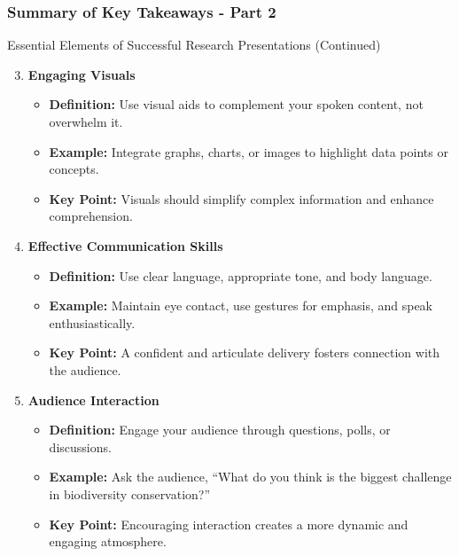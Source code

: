 \documentclass[aspectratio=169]{beamer}
\begin{document}
\begin{frame}[fragile]
    \frametitle{Summary of Key Takeaways - Part 2}
    \begin{block}{Essential Elements of Successful Research Presentations (Continued)}
        \begin{enumerate}
            \setcounter{enumi}{2}
            \item \textbf{Engaging Visuals}
                \begin{itemize}
                    \item \textbf{Definition:} Use visual aids to complement your spoken content, not overwhelm it.
                    \item \textbf{Example:} Integrate graphs, charts, or images to highlight data points or concepts.
                    \item \textbf{Key Point:} Visuals should simplify complex information and enhance comprehension.
                \end{itemize}
            \item \textbf{Effective Communication Skills}
                \begin{itemize}
                    \item \textbf{Definition:} Use clear language, appropriate tone, and body language.
                    \item \textbf{Example:} Maintain eye contact, use gestures for emphasis, and speak enthusiastically.
                    \item \textbf{Key Point:} A confident and articulate delivery fosters connection with the audience.
                \end{itemize}
            \item \textbf{Audience Interaction}
                \begin{itemize}
                    \item \textbf{Definition:} Engage your audience through questions, polls, or discussions.
                    \item \textbf{Example:} Ask the audience, “What do you think is the biggest challenge in biodiversity conservation?”
                    \item \textbf{Key Point:} Encouraging interaction creates a more dynamic and engaging atmosphere.
                \end{itemize}
        \end{enumerate}
    \end{block}
\end{frame}
\end{document}
